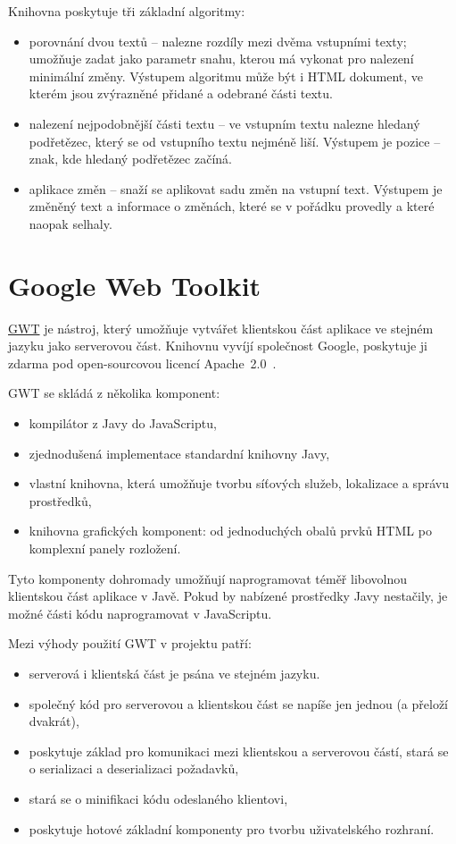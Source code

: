 Knihovna poskytuje tři základní algoritmy:
\begin{itemize}
	\item porovnání dvou textů -- nalezne rozdíly mezi dvěma vstupními texty; umožňuje zadat jako parametr snahu, kterou má vykonat pro nalezení minimální změny.
		Výstupem algoritmu může být i HTML dokument, ve kterém jsou zvýrazněné přidané a odebrané části textu.
	\item nalezení nejpodobnější části textu -- ve vstupním textu nalezne hledaný podřetězec, který se od vstupního textu nejméně liší.
		Výstupem je pozice -- znak, kde hledaný podřetězec začíná.
	\item aplikace změn -- snaží se aplikovat sadu změn na vstupní text.
		Výstupem je změněný text a informace o změnách, které se v pořádku provedly a které naopak selhaly.
\end{itemize}

\section{Google Web Toolkit}

\href{http://www.gwtproject.org/}{GWT} je nástroj, který umožňuje vytvářet klientskou část aplikace ve stejném jazyku jako serverovou část.
Knihovnu vyvíjí společnost Google, poskytuje ji zdarma pod open-sourcovou licencí Apache~2.0~\cite{apache20}.

GWT se skládá z několika komponent:
\begin{itemize}
	\item kompilátor z Javy do JavaScriptu,
	\item zjednodušená implementace standardní knihovny Javy,
	\item vlastní knihovna, která umožňuje tvorbu síťových služeb, lokalizace a správu prostředků,
	\item knihovna grafických komponent: od jednoduchých obalů prvků HTML po komplexní panely rozložení.
\end{itemize}

Tyto komponenty dohromady umožňují naprogramovat téměř libovolnou klientskou část aplikace v Javě.
Pokud by nabízené prostředky Javy nestačily, je možné části kódu naprogramovat v JavaScriptu.

Mezi výhody použití GWT v projektu patří:
\begin{itemize}
    \item serverová i klientská část je psána ve stejném jazyku.
    \item společný kód pro serverovou a klientskou část se napíše jen jednou (a přeloží dvakrát),
    \item poskytuje základ pro komunikaci mezi klientskou a serverovou částí, stará se o serializaci a deserializaci požadavků,
    \item stará se o minifikaci kódu odeslaného klientovi,
    \item poskytuje hotové základní komponenty pro tvorbu uživatelského rozhraní.
\end{itemize}

